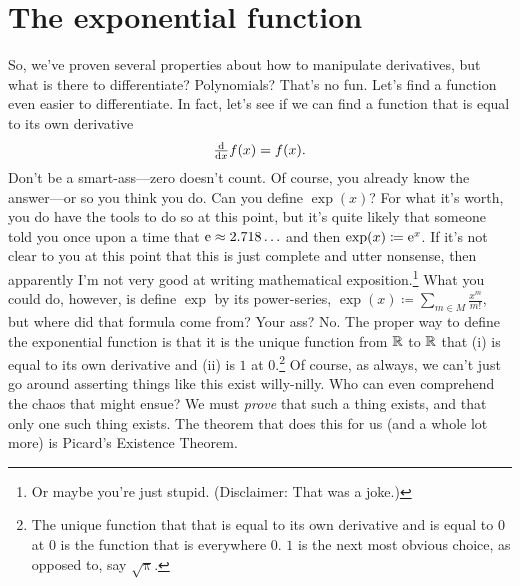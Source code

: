 \section{The exponential function}

So, we've proven several properties about how to manipulate derivatives, but what is there to differentiate?  Polynomials?  That's no fun.  Let's find a function even easier to differentiate.  In fact, let's see if we can find a function that is equal to its own derivative
\begin{equation}
\tfrac{\mathop{}\!\mathrm{d}}{\mathop{}\!\mathrm{d} x}f(x)=f(x).
\end{equation}
Don't be a smart-ass---zero doesn't count.  Of course, you already know the answer---or so you think you do.  Can you define $\exp (x)$?  For what it's worth, you do have the tools to do so at this point, but it's quite likely that someone told you once upon a time that $\mathrm{e} \approx 2.718\ldots $ and then $\exp (x)\coloneqq \mathrm{e} ^x$.  If it's not clear to you at this point that this is just complete and utter nonsense, then apparently I'm not very good at writing mathematical exposition.\footnote{Or maybe you're just stupid.  (Disclaimer:  That was a joke.)}  What you could do, however, is define $\exp$ by its power-series, $\exp (x)\coloneqq \sum _{m\in M}\frac{x^m}{m!}$, but where did that formula come from?  Your ass?  No.  The proper way to define the exponential function is that it is the unique function from $\mathbb{R}$ to $\mathbb{R}$ that (i) is equal to its own derivative and (ii) is $1$ at $0$.\footnote{The unique function that that is equal to its own derivative and is equal to $0$ at $0$ is the function that is everywhere $0$.  $1$ is the next most obvious choice, as opposed to, say $\sqrt{\uppi}$.}  Of course, as always, we can't just go around asserting things like this exist willy-nilly.  Who can even comprehend the chaos that might ensue?  We must \emph{prove} that such a thing exists, and that only one such thing exists.  The theorem that does this for us (and a whole lot more) is Picard's Existence Theorem.
